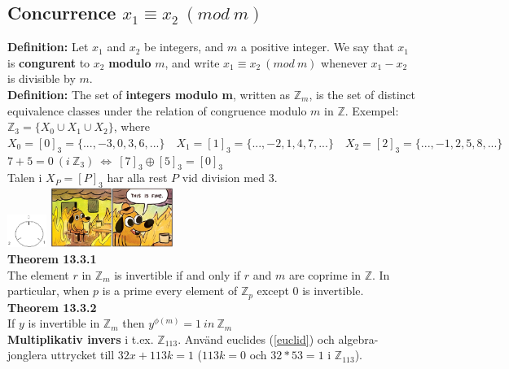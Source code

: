 \documentclass{article}
\begin{document}
\begin{multicols}{2}
\subsection{Concurrence $x_1 \equiv x_2 \ (mod \ m)$} \label{congur}
\textbf{Definition:} Let $x_1$ and $x_2$ be integers, and $m$ a positive integer. We say that $x_1$ is \textbf{congurent} to $x_2$ \textbf{modulo} $m$, and write $x_1 \equiv x_2 \ (mod \ m)$ whenever $x_1-x_2$ is divisible by $m$.\\
\newline
\textbf{Definition:} The set of \textbf{integers modulo m}, written as $\mathbb{Z}_m$, is the set of distinct equivalence classes under the relation of congruence modulo $m$ in $\mathbb{Z}$. Exempel: $\mathbb{Z}_3 = \{X_0 \cup X_1 \cup X_2\}$, where
$X_0 = [0]_3 = \{...,-3,0,3,6,...\} \quad X_1 = [1]_3 = \{...,-2,1,4,7,...\} \quad X_2 = [2]_3 = \{...,-1,2,5,8,...\}$ \quad $7+5=0 \ (i \ \mathbb{Z}_3) \ \iff \ [7]_3 \oplus [5]_3 = [0]_3$\\
\newline
Talen i $X_P = [P]_3$ har alla rest $P$ vid division med 3.\\
\includegraphics[width=0.095\textwidth]{images/mod}
\includegraphics[width=0.3\textwidth]{images/this_is_fine}\\
\textbf{Theorem 13.3.1}\\
The element $r$ in $\mathbb{Z}_m$ is invertible if and only if $r$ and $m$ are coprime in $\mathbb{Z}$. In particular, when $p$ is a prime every element of $\mathbb{Z}_p$ except 0 is invertible.\\
\newline
\textbf{Theorem 13.3.2}\\
If $y$ is invertible in $\mathbb{Z}_m$ then $y^{\phi(m)}=1 \ in \ \mathbb{Z}_m$\\
\newline
\textbf{Multiplikativ invers} i t.ex. $\mathbb{Z}_{113}$. Använd euclides (\ref{euclid}) och algebra-jonglera uttrycket till $32x + 113k = 1$ ($113k=0$ och $32*53=1$ i $\mathbb{Z}_{113}$).


\end{multicols}
\end{document}
